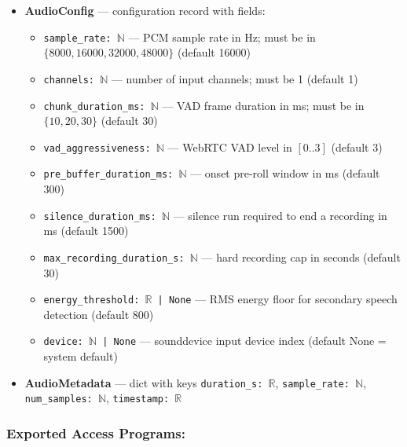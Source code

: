 \documentclass[12pt, titlepage]{article}
\begin{document}
\begin{itemize}
  \item \textbf{AudioConfig} — configuration record with fields:
    \begin{itemize}
      \item \texttt{sample\_rate: $\mathbb{N}$} — PCM sample rate in Hz; must be in $\{8000, 16000, 32000, 48000\}$ (default 16000)
      \item \texttt{channels: $\mathbb{N}$} — number of input channels; must be 1 (default 1)
      \item \texttt{chunk\_duration\_ms: $\mathbb{N}$} — VAD frame duration in ms; must be in $\{10, 20, 30\}$ (default 30)
      \item \texttt{vad\_aggressiveness: $\mathbb{N}$} — WebRTC VAD level in $[0..3]$ (default 3)
      \item \texttt{pre\_buffer\_duration\_ms: $\mathbb{N}$} — onset pre-roll window in ms (default 300)
      \item \texttt{silence\_duration\_ms: $\mathbb{N}$} — silence run required to end a recording in ms (default 1500)
      \item \texttt{max\_recording\_duration\_s: $\mathbb{N}$} — hard recording cap in seconds (default 30)
      \item \texttt{energy\_threshold: $\mathbb{R}$ | None} — RMS energy floor for secondary speech detection (default 800)
      \item \texttt{device: $\mathbb{N}$ | None} — sounddevice input device index (default None = system default)
    \end{itemize}
  \item \textbf{AudioMetadata} — dict with keys \texttt{duration\_s: $\mathbb{R}$}, \texttt{sample\_rate: $\mathbb{N}$}, \texttt{num\_samples: $\mathbb{N}$}, \texttt{timestamp: $\mathbb{R}$}
\end{itemize}

\subsubsection{Exported Access Programs:}
\end{document}
